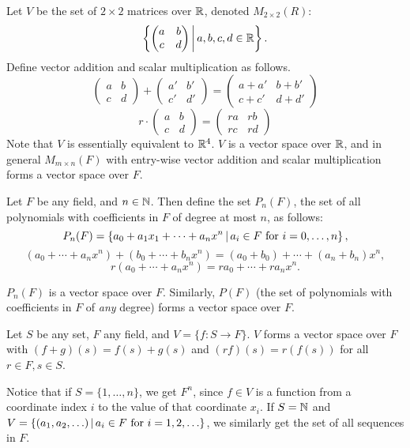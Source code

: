 \begin{exmp}
    Let $V$ be the set of $2 \times 2$ matrices over $\mathbb{R}$, denoted $M_{2 \times 2}(R)$:
    \[\left\{\begin{pmatrix}
            a & b \\ c & d
        \end{pmatrix} \,\middle|\, a,b,c,d \in \mathbb{R} \right\}.\] Define vector addition and scalar multiplication as follows. \[\begin{pmatrix}
            a & b \\ c &d
        \end{pmatrix} + \begin{pmatrix}
            a' & b' \\ c' &d'
        \end{pmatrix} = \begin{pmatrix}
            a + a' & b + b' \\ c + c' &d + d'
        \end{pmatrix}\] \[r \cdot \begin{pmatrix}
            a & b \\ c &d
        \end{pmatrix} = \begin{pmatrix}
            ra & rb \\ rc &rd
        \end{pmatrix}\] Note that $V$ is essentially equivalent to $\mathbb{R}^4$. $V$ is a vector space over $\mathbb{R}$, and in general $M_{m\times n}(F)$ with entry-wise vector addition and scalar multiplication forms a vector space over $F$.
\end{exmp}

\begin{exmp}
    Let $F$ be any field, and $n \in \mathbb{N}$. Then define the set $P_n(F)$, the set of all polynomials with coefficients in $F$ of degree at most $n$, as follows: \[P_n(F) = \left\{a_0 + a_1x_1 + \cdots + a_nx^n \,\middle|\, a_i \in F \textrm{ for }i=0,\ldots,n\right\},\] \[(a_0 + \cdots + a_nx^n) + (b_0 + \cdots + b_nx^n) = (a_0 + b_0) + \cdots + (a_n + b_n)x^n,\] \[r(a_0 + \cdots + a_nx^n) = ra_0 + \cdots + ra_nx^n.\]

    $P_n(F)$ is a vector space over $F$. Similarly, $P(F)$ (the set of polynomials with coefficients in $F$ of \textit{any} degree) forms a vector space over $F$.
\end{exmp}

\begin{exmp}
    Let $S$ be any set, $F$ any field, and $V = \{f: S \to F\}$. $V$ forms a vector space over $F$ with $(f + g)(s) = f(s) + g(s)$ and $(rf)(s) = r(f(s))$ for all $r \in F, s \in S$.

    Notice that if $S = \{1, \ldots, n\}$, we get $F^n$, since $f \in V$ is a function from a coordinate index $i$ to the value of that coordinate $x_i$. If $S = \mathbb{N}$ and $V = \left\{(a_1, a_2, \ldots) \,\middle|\, a_i \in F \textrm{ for } i = 1, 2, \ldots\right\}$, we similarly get the set of all sequences in $F$.
\end{exmp}


